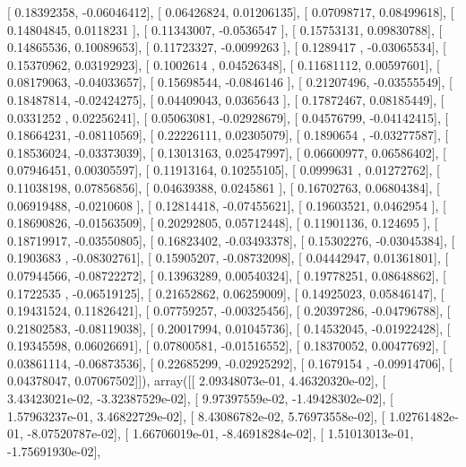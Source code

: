 \documentclass{article}
\begin{document}
       [ 0.18392358, -0.06046412],
       [ 0.06426824,  0.01206135],
       [ 0.07098717,  0.08499618],
       [ 0.14804845,  0.0118231 ],
       [ 0.11343007, -0.0536547 ],
       [ 0.15753131,  0.09830788],
       [ 0.14865536,  0.10089653],
       [ 0.11723327, -0.0099263 ],
       [ 0.1289417 , -0.03065534],
       [ 0.15370962,  0.03192923],
       [ 0.1002614 ,  0.04526348],
       [ 0.11681112,  0.00597601],
       [ 0.08179063, -0.04033657],
       [ 0.15698544, -0.0846146 ],
       [ 0.21207496, -0.03555549],
       [ 0.18487814, -0.02424275],
       [ 0.04409043,  0.0365643 ],
       [ 0.17872467,  0.08185449],
       [ 0.0331252 ,  0.02256241],
       [ 0.05063081, -0.02928679],
       [ 0.04576799, -0.04142415],
       [ 0.18664231, -0.08110569],
       [ 0.22226111,  0.02305079],
       [ 0.1890654 , -0.03277587],
       [ 0.18536024, -0.03373039],
       [ 0.13013163,  0.02547997],
       [ 0.06600977,  0.06586402],
       [ 0.07946451,  0.00305597],
       [ 0.11913164,  0.10255105],
       [ 0.0999631 ,  0.01272762],
       [ 0.11038198,  0.07856856],
       [ 0.04639388,  0.0245861 ],
       [ 0.16702763,  0.06804384],
       [ 0.06919488, -0.0210608 ],
       [ 0.12814418, -0.07455621],
       [ 0.19603521,  0.0462954 ],
       [ 0.18690826, -0.01563509],
       [ 0.20292805,  0.05712448],
       [ 0.11901136,  0.124695  ],
       [ 0.18719917, -0.03550805],
       [ 0.16823402, -0.03493378],
       [ 0.15302276, -0.03045384],
       [ 0.1903683 , -0.08302761],
       [ 0.15905207, -0.08732098],
       [ 0.04442947,  0.01361801],
       [ 0.07944566, -0.08722272],
       [ 0.13963289,  0.00540324],
       [ 0.19778251,  0.08648862],
       [ 0.1722535 , -0.06519125],
       [ 0.21652862,  0.06259009],
       [ 0.14925023,  0.05846147],
       [ 0.19431524,  0.11826421],
       [ 0.07759257, -0.00325456],
       [ 0.20397286, -0.04796788],
       [ 0.21802583, -0.08119038],
       [ 0.20017994,  0.01045736],
       [ 0.14532045, -0.01922428],
       [ 0.19345598,  0.06026691],
       [ 0.07800581, -0.01516552],
       [ 0.18370052,  0.00477692],
       [ 0.03861114, -0.06873536],
       [ 0.22685299, -0.02925292],
       [ 0.1679154 , -0.09914706],
       [ 0.04378047,  0.07067502]]), array([[  2.09348073e-01,   4.46320320e-02],
       [  3.43423021e-02,  -3.32387529e-02],
       [  9.97397559e-02,  -1.49428302e-02],
       [  1.57963237e-01,   3.46822729e-02],
       [  8.43086782e-02,   5.76973558e-02],
       [  1.02761482e-01,  -8.07520787e-02],
       [  1.66706019e-01,  -8.46918284e-02],
       [  1.51013013e-01,  -1.75691930e-02],
\end{document}
